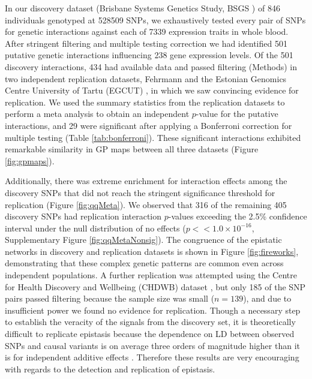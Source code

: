 \documentclass{article}
\begin{document}
In our discovery dataset (Brisbane Systems Genetics Study, BSGS \cite{Powell2012}) of 846 individuals genotyped at 528509 SNPs, we exhaustively tested every pair of SNPs for genetic interactions against each of 7339 expression traits in whole blood. After stringent filtering and multiple testing correction we had identified 501 putative genetic interactions influencing 238 gene expression levels. Of the 501 discovery interactions, 434 had available data and passed filtering (Methods) in two independent replication datasets, Fehrmann \cite{Fehrmann2011} and the Estonian Genomics Centre University of Tartu (EGCUT) \cite{Metspalu2004}, in which we saw convincing evidence for replication. We used the summary statistics from the replication datasets to perform a meta analysis to obtain an independent $p$-value for the putative interactions, and 29 were significant after applying a Bonferroni correction for multiple testing (Table \ref{tab:bonferroni}). These significant interactions exhibited remarkable similarity in GP maps between all three datasets (Figure \ref{fig:gpmaps}).

Additionally, there was extreme enrichment for interaction effects among the discovery SNPs that did not reach the stringent significance threshold for replication (Figure \ref{fig:qqMeta}). We observed that 316 of the remaining 405 discovery SNPs had replication interaction $p$-values exceeding the 2.5\% confidence interval under the null distribution of no effects ($p << 1.0 \times 10^{-16}$, Supplementary Figure \ref{fig:qqMetaNonsig}). The congruence of the epistatic networks in discovery and replication datasets is shown in Figure \ref{fig:fireworks}, demonstrating that these complex genetic patterns are common even across independent populations. A further replication was attempted using the Centre for Health Discovery and Wellbeing (CHDWB) dataset \cite{Preininger2013}, but only 185 of the SNP pairs passed filtering because the sample size was small ($n=139$), and due to insufficient power we found no evidence for replication. Though a necessary step to establish the veracity of the signals from the discovery set, it is theoretically difficult to replicate epistasis because the dependence on LD between observed SNPs and causal variants is on average three orders of magnitude higher than it is for independent additive effects \cite{Weir2008, Hemani2013}. Therefore these results are very encouraging with regards to the detection and replication of epistasis.
\end{document}
